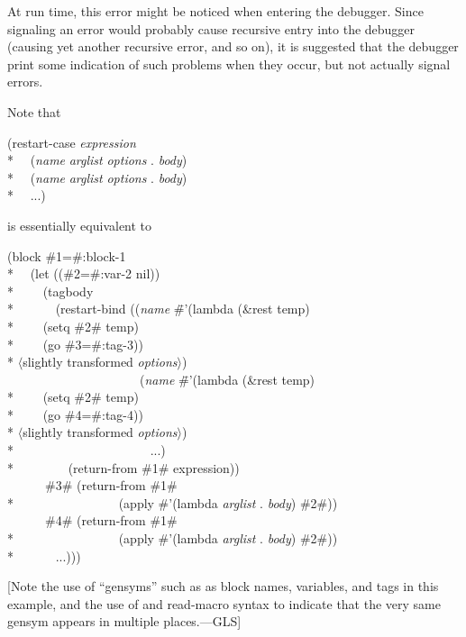 \begin{defmac}
\begin{flushdesc}
\begin{implementation}
      At run time, this error might be noticed when entering
      the debugger. Since signaling an error would probably cause recursive
      entry into the debugger (causing yet another recursive error, and so on), it is
      suggested that the debugger print some indication of such problems when
      they occur, but not actually signal errors.
\end{implementation}
\afternoterule
\end{flushdesc}

Note that 
\begin{lisp}
(restart-case \emph{expression} \\*
~~(\emph{name} \emph{arglist} \emph{options} . \emph{body}) \\*
~~(\emph{name} \emph{arglist} \emph{options} . \emph{body}) \\*
~~...)
\end{lisp}
is essentially equivalent to
\begin{lisp}
(block \#1=\#:block-1 \\*
~~(let ((\#2=\#:var-2 nil)) \\*
~~~~(tagbody \\*
~~~~~~(restart-bind ((\emph{name} \=\#'(lambda (\&rest temp) \\*
\>~~~~(setq \#2\# temp) \\*
\>~~~~(go \#3=\#:tag-3)) \\*
\>\textrm{$\langle$slightly transformed \emph{options}$\rangle$}) \\
~~~~~~~~~~~~~~~~~~~~~(\emph{name} \=\#'(lambda (\&rest temp) \\*
\>~~~~(setq \#2\# temp) \\*
\>~~~~(go \#4=\#:tag-4)) \\*
\>\textrm{$\langle$slightly transformed \emph{options}$\rangle$}) \\*
~~~~~~~~~~~~~~~~~~~~~...) \\*
~~~~~~~~(return-from \#1\# expression)) \\
~~~~~~\#3\# (return-from \#1\# \\*
~~~~~~~~~~~~~~~~(apply \#'(lambda \emph{arglist} . \emph{body}) \#2\#)) \\
~~~~~~\#4\# (return-from \#1\# \\*
~~~~~~~~~~~~~~~~(apply \#'(lambda \emph{arglist} . \emph{body}) \#2\#)) \\*
~~~~~~...)))
\end{lisp}
[Note the use of ``gensyms'' such as  as block names,
variables, and  tags in this example,
and the use of  and  read-macro syntax
to indicate that the very same gensym appears in multiple places.---GLS]



\end{defmac}
